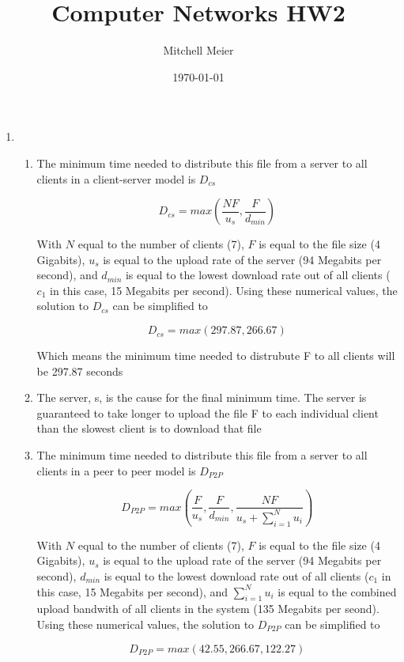 \documentclass[14pt]{article}
\title{Computer Networks HW2}
\author{Mitchell Meier}
\date{\today}
\begin{document}
\maketitle

\begin{enumerate}

\item
\begin{enumerate}[(1)]
\item
The minimum time needed to distribute this file from a server to all clients in a client-server model is $D_{cs}$  

\[D_{cs} = max(\frac{NF}{u_s},\frac{F}{d_{min}})\]

With $N$ equal to the number of clients (7), $F$ is equal to the file size (4 Gigabits), $u_s$ is equal to the upload rate of the server (94 Megabits per second), and $d_{min}$ is equal to the lowest download rate out of all clients ($c_1$ in this case, 15 Megabits per second). Using these numerical values, the solution to $D_{cs}$ can be simplified to

\[D_{cs} = max(297.87,266.67)\]

Which means the minimum time needed to distrubute F to all clients will be 297.87 seconds \\

\item
The server, s, is the cause for the final minimum time. The server is guaranteed to take longer to upload the file F to each individual client than the slowest client is to download that file \\

\item
The minimum time needed to distribute this file from a server to all clients in a peer to peer model is $D_{P2P}$

\[D_{P2P} = max(\frac{F}{u_s},\frac{F}{d_{min}},\frac{NF}{u_s + \sum\limits_{i=1}^{N} u_i})\] 

With $N$ equal to the number of clients (7), $F$ is equal to the file size (4 Gigabits), $u_s$ is equal to the upload rate of the server (94 Megabits per second), $d_{min}$ is equal to the lowest download rate out of all clients ($c_1$ in this case, 15 Megabits per second), and $\sum_{i=1}^{N} u_i$ is equal to the combined upload bandwith of all clients in the system (135 Megabits per seond). Using these numerical values, the solution to $D_{P2P}$ can be simplified to 

\[D_{P2P} = max(42.55,266.67,122.27)\] 


\end{enumerate}
\end{enumerate}
\end{document}
